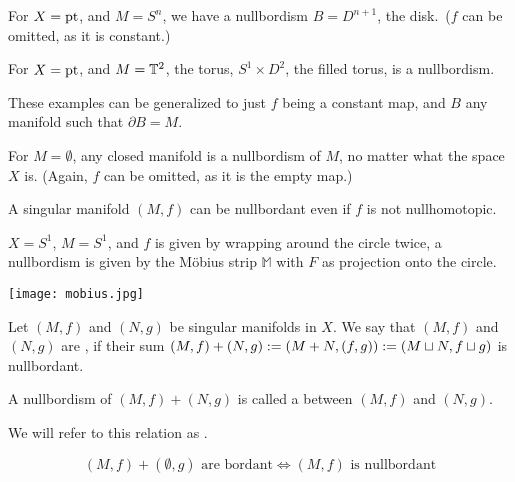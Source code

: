 \documentclass[a4paper,11pt]{article}
\begin{document}
\begin{example}
    For \(X=\mathrm{pt}\), and \(M=S^n\), we have a nullbordism \(B=D^{n+1}\), the disk.\ (\(f\) can be omitted, as it is constant.)
\end{example}

\begin{example}
    For \(X=\mathrm{pt}\), and \(M=\mathbb{T}^2\), the torus, \(S^1\times D^2\), the filled torus, is a nullbordism.
\end{example}

\begin{remark}
    These examples can be generalized to just \(f\) being a constant %
    map, and \(B\) any manifold such that \(\partial B=M\). 
\end{remark}

\begin{example}
    For \(M=\emptyset\), any closed manifold is a nullbordism of \(M\), no matter what the space \(X\) is. (Again, \(f\) can be omitted, as it is the empty map.)
\end{example}

\begin{observation}
    A singular manifold \((M,f)\) can be nullbordant even if \(f\) is not nullhomotopic.
\end{observation}

\begin{example}
    \(X=S^1\), \(M=S^1\), and \(f\) is given by wrapping around the circle twice, a nullbordism is given by the M\"obius strip \(\mathbb{M}\) with \(F\) as projection onto the circle.\begin{center} \texttt{[image: mobius.jpg]} \end{center}
\end{example}


\begin{definition}\label{bordant}
    Let \((M,f)\) and \((N,g)\) be singular manifolds in \(X\). We say that \((M,f)\) and \((N,g)\) are , if their sum \((M,f)+(N,g):=(M+N, (f,g)):=(M\sqcup N, f\sqcup g)\) is nullbordant.

    A nullbordism of \((M,f)+(N,g)\) is called a  between \((M,f)\) and \((N,g)\).
\end{definition}

We will refer to this relation as .

\begin{remark}
    \[(M,f)+(\emptyset,g) \text{ are bordant} \iff (M,f) \text{ is nullbordant}\]
\end{remark}
\end{document}
